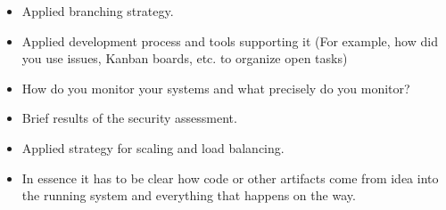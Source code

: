   
  \begin{itemize}

  \item Applied branching strategy.
  \item Applied development process and tools supporting it (For example, how did you use issues, Kanban boards, etc. to organize open tasks)
  \item How do you monitor your systems and what precisely do you monitor?
  \item Brief results of the security assessment.
  \item Applied strategy for scaling and load balancing.
  \item In essence it has to be clear how code or other artifacts come from idea into the running system and everything that happens on the way.
  
\end{itemize}